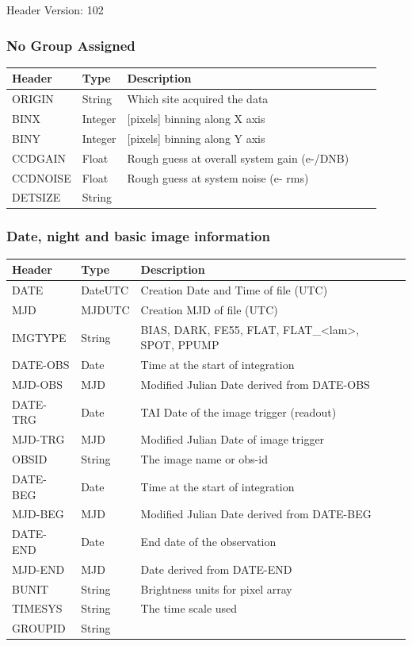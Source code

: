 Header Version: 102

\subsubsection{No Group Assigned}
\begin{tabular}{l l l l l}

\hline
Header & Type & Description \\
\hline
ORIGIN & String & Which site acquired the data \\
BINX & Integer & [pixels] binning along X axis \\
BINY & Integer & [pixels] binning along Y axis \\
CCDGAIN & Float & Rough guess at overall system gain (e-/DNB) \\
CCDNOISE & Float & Rough guess at system noise (e- rms) \\
DETSIZE & String &  \\
\hline
\end{tabular}


\subsubsection{Date, night and basic image information}
\begin{tabular}{l l l l l}

\hline
Header & Type & Description \\
\hline
DATE & DateUTC & Creation Date and Time of file (UTC) \\
MJD & MJDUTC & Creation MJD of file (UTC) \\
IMGTYPE & String & BIAS, DARK, FE55, FLAT, FLAT\_<lam>, SPOT, PPUMP \\
DATE-OBS & Date & Time at the start of integration \\
MJD-OBS & MJD & Modified Julian Date derived from DATE-OBS \\
DATE-TRG & Date & TAI Date of the image trigger (readout) \\
MJD-TRG & MJD & Modified Julian Date of image trigger \\
OBSID & String & The image name or obs-id \\
DATE-BEG & Date & Time at the start of integration \\
MJD-BEG & MJD & Modified Julian Date derived from DATE-BEG \\
DATE-END & Date & End date of the observation \\
MJD-END & MJD & Date derived from DATE-END \\
BUNIT & String & Brightness units for pixel array \\
TIMESYS & String & The time scale used \\
GROUPID & String &  \\
\hline
\end{tabular}



